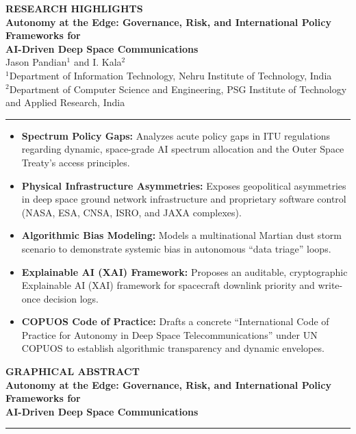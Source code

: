 \documentclass[12pt]{article}
\begin{document}
\thispagestyle{empty}
\begin{center}
    \vspace*{1cm}
    {\large\bfseries\sffamily\color{blue!80} RESEARCH HIGHLIGHTS} \\[1.5em]
    {\large\bfseries Autonomy at the Edge: Governance, Risk, and International Policy Frameworks for\\ AI-Driven Deep Space Communications} \\[1.0em]
    {\small Jason Pandian$^{1}$ and I. Kala$^{2}$} \\[0.5em]
    {\scriptsize $^{1}$Department of Information Technology, Nehru Institute of Technology, India \\
    $^{2}$Department of Computer Science and Engineering, PSG Institute of Technology and Applied Research, India} \\
    \rule{\linewidth}{1.5pt}
    \vspace{2cm}
\end{center}

\begin{itemize}
    \setlength{\itemsep}{1.5em}
    \item \textbf{Spectrum Policy Gaps:} Analyzes acute policy gaps in ITU regulations regarding dynamic, space-grade AI spectrum allocation and the Outer Space Treaty's access principles.
    \item \textbf{Physical Infrastructure Asymmetries:} Exposes geopolitical asymmetries in deep space ground network infrastructure and proprietary software control (NASA, ESA, CNSA, ISRO, and JAXA complexes).
    \item \textbf{Algorithmic Bias Modeling:} Models a multinational Martian dust storm scenario to demonstrate systemic bias in autonomous ``data triage'' loops.
    \item \textbf{Explainable AI (XAI) Framework:} Proposes an auditable, cryptographic Explainable AI (XAI) framework for spacecraft downlink priority and write-once decision logs.
    \item \textbf{COPUOS Code of Practice:} Drafts a concrete ``International Code of Practice for Autonomy in Deep Space Telecommunications'' under UN COPUOS to establish algorithmic transparency and dynamic envelopes.
\end{itemize}

\newpage

\thispagestyle{empty}
\begin{center}
    \vspace*{0.5cm}
    {\large\bfseries\sffamily\color{blue!80} GRAPHICAL ABSTRACT} \\[1.0em]
    {\large\bfseries Autonomy at the Edge: Governance, Risk, and International Policy Frameworks for\\ AI-Driven Deep Space Communications} \\[1.5em]
    \rule{\linewidth}{1.5pt}
    \vspace{2.5cm}
\end{center}
\end{document}

